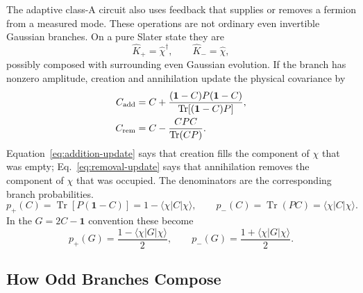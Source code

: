 \documentclass[aps,prb,onecolumn,nofootinbib,superscriptaddress]{revtex4-2}
\newcommand{\I}{\mathbf{1}}
\newcommand{\Tr}{\operatorname{Tr}}
\newcommand{\ket}[1]{\lvert #1\rangle}
\newcommand{\bra}[1]{\langle #1\rvert}
\theoremstyle{plain}
\theoremstyle{definition}
\begin{document}
The adaptive class-A circuit also uses feedback that supplies or removes a
fermion from a measured mode.  These operations are not ordinary even
invertible Gaussian branches.  On a pure Slater state they are
\begin{equation}
  \hat K_+=\hat\chi^\dagger,
  \qquad
  \hat K_-=\hat\chi ,
  \label{eq:odd-state-branches}
\end{equation}
possibly composed with surrounding even Gaussian evolution.  If the branch
has nonzero amplitude, creation and annihilation update the physical covariance
by
\begin{align}
  C_{\rm add}
  &=
  C+
  \frac{(\I-C)P(\I-C)}
       {\Tr[(\I-C)P]},
  \label{eq:addition-update}\\
  C_{\rm rem}
  &=
  C-
  \frac{CPC}
       {\Tr(CP)} .
  \label{eq:removal-update}
\end{align}
Equation~\eqref{eq:addition-update} says that creation fills the component of
\(\chi\) that was empty; Eq.~\eqref{eq:removal-update} says that annihilation
removes the component of \(\chi\) that was occupied.  The denominators are the
corresponding branch probabilities.
\begin{equation}
  p_+(C)=\Tr[P(\I-C)]=1-\bra{\chi}C\ket{\chi},
  \qquad
  p_-(C)=\Tr(PC)=\bra{\chi}C\ket{\chi}.
  \label{eq:gain-loss-probabilities}
\end{equation}
In the \(G=2C-\I\) convention these become
\begin{equation}
  p_+(G)=\frac{1-\bra{\chi}G\ket{\chi}}{2},
  \qquad
  p_-(G)=\frac{1+\bra{\chi}G\ket{\chi}}{2}.
  \label{eq:gain-loss-probabilities-G}
\end{equation}

\subsection{How Odd Branches Compose}
\label{sec:odd-composition}
\end{document}
